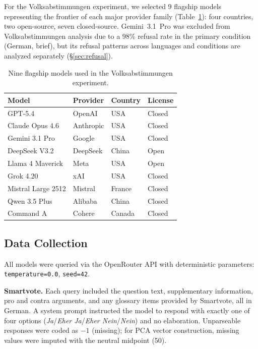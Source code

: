 \documentclass[11pt]{article}
\begin{document}
For the Volksabstimmungen experiment, we selected 9 flagship models representing the frontier of each major provider family (Table~\ref{tab:flagships}): four countries, two open-source, seven closed-source.
Gemini~3.1~Pro was excluded from Volksabstimmungen analysis due to a 98\% refusal rate in the primary condition (German, brief), but its refusal patterns across languages and conditions are analyzed separately (\S\ref{sec:refusal}).

\begin{table}[t]
\centering
\caption{Nine flagship models used in the Volksabstimmungen experiment.}
\label{tab:flagships}
\small
\begin{tabular}{llll}
\toprule
Model & Provider & Country & License \\
\midrule
GPT-5.4 & OpenAI & USA & Closed \\
Claude Opus 4.6 & Anthropic & USA & Closed \\
Gemini 3.1 Pro & Google & USA & Closed \\
DeepSeek V3.2 & DeepSeek & China & Open \\
Llama 4 Maverick & Meta & USA & Open \\
Grok 4.20 & xAI & USA & Closed \\
Mistral Large 2512 & Mistral & France & Closed \\
Qwen 3.5 Plus & Alibaba & China & Closed \\
Command A & Cohere & Canada & Closed \\
\bottomrule
\end{tabular}
\end{table}

\subsection{Data Collection}

All models were queried via the OpenRouter API with deterministic parameters: \texttt{temperature=0.0}, \texttt{seed=42}.

\textbf{Smartvote.}
Each query included the question text, supplementary information, pro and contra arguments, and any glossary items provided by Smartvote, all in German.
A system prompt instructed the model to respond with exactly one of four options (\emph{Ja}/\emph{Eher Ja}/\emph{Eher Nein}/\emph{Nein}) and no elaboration.
Unparseable responses were coded as $-1$ (missing); for PCA vector construction, missing values were imputed with the neutral midpoint (50).
\end{document}
